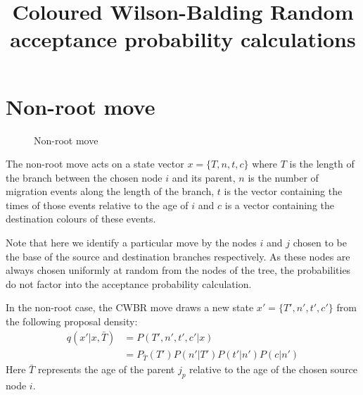 \documentclass[a4paper,11pt]{article}
\title{Coloured Wilson-Balding Random\\%
acceptance probability calculations}
\begin{document}
\maketitle

\section{Non-root move}

\begin{figure}
\begin{center}
\end{center}
\caption{Non-root move}
\end{figure}

The non-root move acts on a state vector $x=\{T,n,t,c\}$ where $T$ is
the length of the branch between the chosen node $i$ and its parent,
$n$ is the number of migration events along the length of the branch,
$t$ is the vector containing the times of those events relative to the
age of $i$ and $c$ is a vector containing the destination colours of
these events.

Note that here we identify a particular move by the nodes $i$ and $j$
chosen to be the base of the source and destination branches
respectively. As these nodes are always chosen uniformly at random from the
nodes of the tree, the probabilities do not factor into the acceptance
probability calculation.

In the non-root case, the CWBR move draws a new state
$x'=\{T',n',t',c'\}$ from the following proposal density:
\begin{align}
  q(x'|x,\bar{T}) &= P(T',n',t',c'|x)\nonumber\\
&= P_{\bar{T}}(T')P(n'|T')P(t'|n')P(c|n')
\end{align}
Here $\bar{T}$ represents the age of the parent $j_p$ relative to the
age of the chosen source node $i$.
\end{document}
